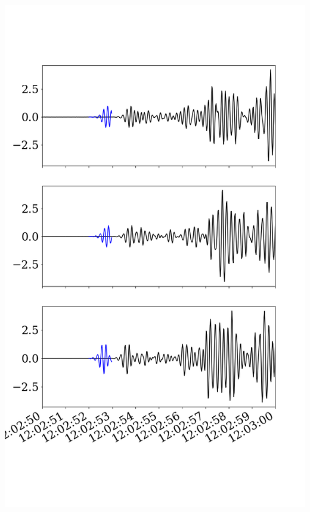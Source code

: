 \documentclass{beamer}
\begin{document}
\begin{frame}
\begin{minipage}{0.4\linewidth}
    \includegraphics[width=1.2\linewidth]{images/fig_2.png}
 \end{minipage}
 
\end{frame}
\end{document}
